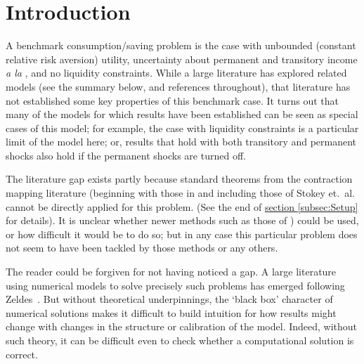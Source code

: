 \documentclass[titlepage]{\econtex}\providecommand{\texname}{BufferStockTheory}
\begin{document}
\titlepagefinish


\newtheorem{defn}{Definition}
\newtheorem{theorem}{Theorem}

\hypertarget{Introduction}{}
\section{Introduction}

\label{sec:intro}


A benchmark consumption/saving problem is the case with unbounded (constant relative risk aversion) utility, uncertainty about permanent and transitory income \textit{a la} \cite{friedmanATheory}, and no liquidity constraints.  While a large literature has explored related models (see the summary below, and references throughout), that literature has not established some key properties of this benchmark case.  It turns out that many of the models for which results have been established can be seen as special cases of this model; for example, the case with liquidity constraints is a particular limit of the model here; or, results that hold with both transitory and permanent shocks also hold if the permanent shocks are turned off.

The literature gap exists partly because standard theorems from the contraction mapping literature (beginning with those in \cite{bellmanDynamicProgramming} and including those of Stokey et.~al.~\citeyearpar{slpMethods} cannot be directly applied for this problem.  (See the end of \hyperlink{DiffFromLit}{section \ref{subsec:Setup}} for details).  It is unclear whether newer methods such as those of \cite{mnUnique}) could be used, or how difficult it would be to do so; but in any case this particular problem does not seem to have been tackled by those methods or any others.  

The reader could be forgiven for not having noticed a gap.  A large literature using numerical models to solve precisely such problems has emerged following Zeldes~\citeyearpar{zeldesStochastic}.  But without theoretical underpinnings, the `black box' character of numerical solutions makes it difficult to build intuition for how results might change with changes in the structure or calibration of the model.  Indeed, without such theory, it can be difficult even to check whether a computational solution is correct.
\end{document}
